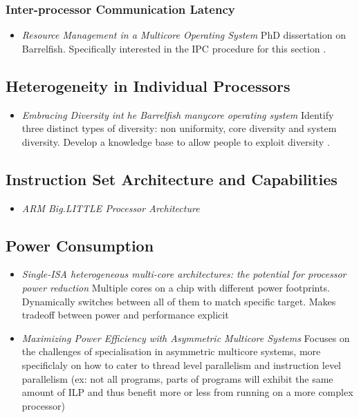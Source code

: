 \subsubsection{Inter-processor Communication Latency}
\begin{itemize}
\item \emph{Resource Management in a Multicore Operating System} PhD dissertation
on Barrelfish. Specifically interested in the IPC procedure for this section \cite{10.1109/MM.2011.1}.

\end{itemize}
\subsection{Heterogeneity in Individual Processors}
\begin{itemize}
\item \emph{Embracing Diversity int he Barrelfish manycore operating system}
Identify three distinct types of diversity: non uniformity, core diversity and 
system diversity. Develop a knowledge base to allow people to exploit
diversity \cite{Schuepbach08embracingdiversity}.
\end{itemize}
\subsection{Instruction Set Architecture and Capabilities}
\begin{itemize}
\item \emph{ARM Big.LITTLE Processor Architecture} \cite{ABL}
\end{itemize}

\subsection{Power Consumption}
\begin{itemize}
\item \emph{Single-ISA heterogeneous multi-core architectures: the potential 
for processor power reduction}  Multiple cores on a chip with different power
footprints. Dynamically switches between all of them to match specific target.
Makes tradeoff between power and performance explicit
\item \emph {Maximizing Power Efficiency with Asymmetric Multicore Systems
} Focuses on the challenges of specialisation in asymmetric multicore systems,
more specificlaly on how to cater to thread level parallelism and instruction level
parallelism (ex: not all programs, parts of programs will exhibit the same
amount of ILP and thus benefit more or less from running on a more complex
processor)
\end{itemize}
